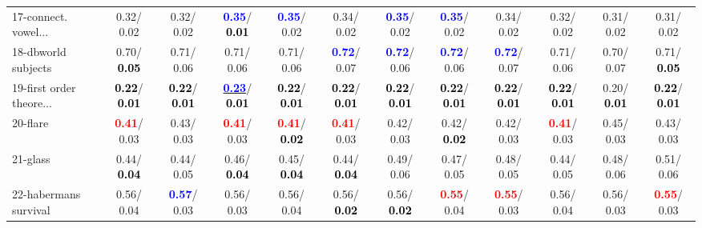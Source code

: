 \begin{table}[h]
\begin{center}
{\begin{tabular}{lc|c|c|c|c|c|c|c|c|c|c}
17-connect. vowel... &   0.32/  0.02 &   0.32/  0.02 & \textcolor{blue}{\textbf{  0.35}}/\textcolor{black}{\textbf{  0.01}} & \textcolor{blue}{\textbf{  0.35}}/  0.02 &   0.34/  0.02 & \textcolor{blue}{\textbf{  0.35}}/  0.02 & \textcolor{blue}{\textbf{  0.35}}/  0.02 &   0.34/  0.02 &   0.32/  0.02 &   0.31/  0.02 &   0.31/  0.02 \\
18-dbworld subjects &   0.70/\textcolor{black}{\textbf{  0.05}} &   0.71/  0.06 &   0.71/  0.06 &   0.71/  0.06 & \textcolor{blue}{\textbf{  0.72}}/  0.07 & \textcolor{blue}{\textbf{  0.72}}/  0.06 & \textcolor{blue}{\textbf{  0.72}}/  0.06 & \textcolor{blue}{\textbf{  0.72}}/  0.07 &   0.71/  0.06 &   0.70/  0.07 &   0.71/\textcolor{black}{\textbf{  0.05}} \\
19-first order theore... & \textcolor{black}{\textbf{  0.22}}/\textcolor{black}{\textbf{  0.01}} & \textcolor{black}{\textbf{  0.22}}/\textcolor{black}{\textbf{  0.01}} & \underline{\textcolor{blue}{\textbf{  0.23}}}/\textcolor{black}{\textbf{  0.01}} & \textcolor{black}{\textbf{  0.22}}/\textcolor{black}{\textbf{  0.01}} & \textcolor{black}{\textbf{  0.22}}/\textcolor{black}{\textbf{  0.01}} & \textcolor{black}{\textbf{  0.22}}/\textcolor{black}{\textbf{  0.01}} & \textcolor{black}{\textbf{  0.22}}/\textcolor{black}{\textbf{  0.01}} & \textcolor{black}{\textbf{  0.22}}/\textcolor{black}{\textbf{  0.01}} & \textcolor{black}{\textbf{  0.22}}/\textcolor{black}{\textbf{  0.01}} &   0.20/\textcolor{black}{\textbf{  0.01}} & \textcolor{black}{\textbf{  0.22}}/\textcolor{black}{\textbf{  0.01}} \\
20-flare & \textcolor{red}{\textbf{  0.41}}/  0.03 &   0.43/  0.03 & \textcolor{red}{\textbf{  0.41}}/  0.03 & \textcolor{red}{\textbf{  0.41}}/\textcolor{black}{\textbf{  0.02}} & \textcolor{red}{\textbf{  0.41}}/  0.03 &   0.42/  0.03 &   0.42/\textcolor{black}{\textbf{  0.02}} &   0.42/  0.03 & \textcolor{red}{\textbf{  0.41}}/  0.03 &   0.45/  0.03 &   0.43/  0.03 \\
21-glass &   0.44/\textcolor{black}{\textbf{  0.04}} &   0.44/  0.05 &   0.46/\textcolor{black}{\textbf{  0.04}} &   0.45/\textcolor{black}{\textbf{  0.04}} &   0.44/\textcolor{black}{\textbf{  0.04}} &   0.49/  0.06 &   0.47/  0.05 &   0.48/  0.05 &   0.44/  0.05 &   0.48/  0.06 &   0.51/  0.06 \\ \hline
22-habermans survival &   0.56/  0.04 & \textcolor{blue}{\textbf{  0.57}}/  0.03 &   0.56/  0.03 &   0.56/  0.04 &   0.56/\textcolor{black}{\textbf{  0.02}} &   0.56/\textcolor{black}{\textbf{  0.02}} & \textcolor{red}{\textbf{  0.55}}/  0.04 & \textcolor{red}{\textbf{  0.55}}/  0.03 &   0.56/  0.04 &   0.56/  0.03 & \textcolor{red}{\textbf{  0.55}}/  0.03 \\

\end{tabular}}
\end{center}
\end{table}
